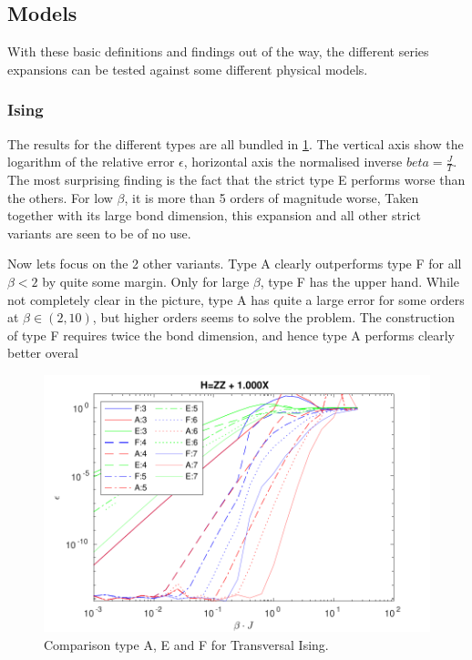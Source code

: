 \subsection{Models}

With these basic definitions and findings out of the way, the different series expansions can be tested against some different physical models.

\subsubsection{Ising}

The results for the different types are all bundled in \cref{fig:benchmark:tising}. The vertical axis show the logarithm of the relative error $\epsilon$, horizontal axis the normalised inverse $beta= \frac{J}{T}$. The most surprising finding is the fact that the strict type E performs worse than the others. For low $\beta$, it is more than 5 orders of magnitude worse, Taken together with its large bond dimension, this expansion  and all other strict variants are seen to be of no use.

Now lets focus on the 2 other variants. Type A clearly outperforms type F for all $\beta<2$ by quite some margin. Only for large $\beta$, type F has the upper hand. While not completely clear in the picture, type A has quite a large error for some orders at $\beta \in (2,10) $, but higher orders seems to solve the problem. The construction of type F requires twice the bond dimension, and hence type A performs clearly better overal

\begin{figure}[H]
    \center
    \includegraphics[width=\textwidth]{Figuren/benchmarking/t_ising.pdf}
    \caption{Comparison type A, E and F for Transversal Ising. }
    \label{fig:benchmark:tising}
\end{figure}

